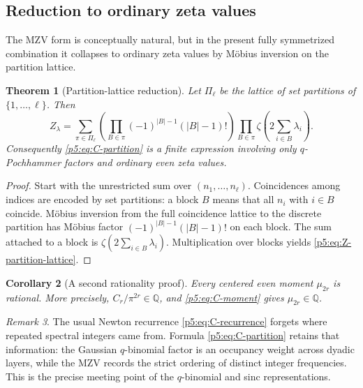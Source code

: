 \documentclass[11pt]{article}
\numberwithin{equation}{section}
\newtheorem{theorem}{Theorem}[section]
\newtheorem{corollary}[theorem]{Corollary}
\theoremstyle{definition}
\theoremstyle{remark}
\newtheorem{remark}[theorem]{Remark}
\newcommand{\Q}{\mathbb Q}
\begin{document}
\subsection{Reduction to ordinary zeta values}

The MZV form is conceptually natural, but in the present fully symmetrized
combination it collapses to ordinary zeta values by M\"obius inversion on the
partition lattice.

\begin{theorem}[Partition-lattice reduction]\label{p5:thm:partition-lattice}
Let $\Pi_\ell$ be the lattice of set partitions of $\{1,\dots,\ell\}$.  Then
\begin{equation}\label{p5:eq:Z-partition-lattice}
 \boxed{
 Z_\lambda=
 \sum_{\pi\in\Pi_\ell}
 \left(\prod_{B\in\pi}(-1)^{|B|-1}(|B|-1)!\right)
 \prod_{B\in\pi}
 \zeta\!\left(2\sum_{i\in B}\lambda_i\right).}
\end{equation}
Consequently \cref{p5:eq:C-partition} is a finite expression involving only
$q$-Pochhammer factors and ordinary even zeta values.
\end{theorem}

\begin{proof}
Start with the unrestricted sum over $(n_1,\dots,n_\ell)$.  Coincidences among
indices are encoded by set partitions: a block $B$ means that all $n_i$ with
$i\in B$ coincide.  M\"obius inversion from the full coincidence lattice to
the discrete partition has M\"obius factor
$(-1)^{|B|-1}(|B|-1)!$ on each block.  The sum attached to a block is
$\zeta(2\sum_{i\in B}\lambda_i)$.  Multiplication over blocks yields
\cref{p5:eq:Z-partition-lattice}.
\end{proof}

\begin{corollary}[A second rationality proof]\label{p5:cor:q-mzv-rational}
Every centered even moment $\mu_{2r}$ is rational.  More precisely,
$C_r/\pi^{2r}\in\Q$, and \cref{p5:eq:C-moment} gives $\mu_{2r}\in\Q$.
\end{corollary}

\begin{remark}
The usual Newton recurrence \cref{p5:eq:C-recurrence} forgets where repeated
spectral integers came from.  Formula \cref{p5:eq:C-partition} retains that
information: the Gaussian $q$-binomial factor is an occupancy weight across
dyadic layers, while the MZV records the strict ordering of distinct integer
frequencies.  This is the precise meeting point of the $q$-binomial and sinc
representations.
\end{remark}
\end{document}
